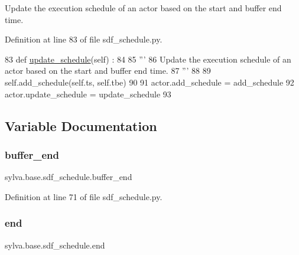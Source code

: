 \begin{DoxyVerb}  Update the execution schedule of an actor based on the start and buffer end time.
\end{DoxyVerb}
 

Definition at line 83 of file sdf\+\_\+schedule.\+py.


\begin{DoxyCode}
83 \textcolor{keyword}{def }\hyperlink{namespacesylva_1_1base_1_1sdf__schedule_a529fa8c65b064ae4c5ac6355d12483fa}{update\_schedule}(self) :
84 
85   \textcolor{stringliteral}{'''}
86 \textcolor{stringliteral}{    Update the execution schedule of an actor based on the start and buffer end time.}
87 \textcolor{stringliteral}{  '''}
88 
89   self.add\_schedule(self.ts, self.tbe)
90 
91 actor.add\_schedule = add\_schedule
92 actor.update\_schedule = update\_schedule
93 \end{DoxyCode}


\subsection{Variable Documentation}
\mbox{\label{namespacesylva_1_1base_1_1sdf__schedule_a04c239d8283f1618f063ef92036c8c4c}} 
\subsubsection{\texorpdfstring{buffer\+\_\+end}{buffer\_end}}
{\footnotesize\ttfamily sylva.\+base.\+sdf\+\_\+schedule.\+buffer\+\_\+end}



Definition at line 71 of file sdf\+\_\+schedule.\+py.

\mbox{\label{namespacesylva_1_1base_1_1sdf__schedule_ae4cd61d6bd60aac9bb906e858fa30117}} 
\subsubsection{\texorpdfstring{end}{end}}
{\footnotesize\ttfamily sylva.\+base.\+sdf\+\_\+schedule.\+end}



